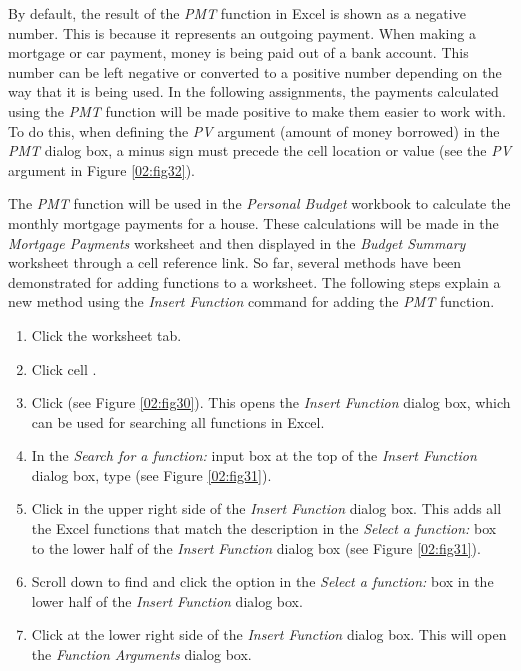 By default, the result of the \textit{PMT} function in Excel is shown as a negative number. This is because it represents an outgoing payment. When making a mortgage or car payment, money is being paid out of a bank account. This number can be left negative or converted to a positive number depending on the way that it is being used. In the following assignments, the payments calculated using the \textit{PMT} function will be made positive to make them easier to work with. To do this, when defining the \textit{PV} argument (amount of money borrowed) in the \textit{PMT} dialog box, a minus sign must precede the cell location or value (see the \textit{PV} argument in Figure \ref{02:fig32}).

The \textit{PMT} function will be used in the \textit{Personal Budget} workbook to calculate the monthly mortgage payments for a house. These calculations will be made in the \textit{Mortgage Payments} worksheet and then displayed in the \textit{Budget Summary} worksheet through a cell reference link. So far, several methods have been demonstrated for adding functions to a worksheet. The following steps explain a new method using the \textit{Insert Function} command for adding the \textit{PMT} function.

\begin{enumbox}
	\begin{enumerate}
		\item Click the  worksheet tab.
		\item Click cell .
		\item Click  (see Figure \ref{02:fig30}). This opens the \textit{Insert Function} dialog box, which can be used for searching all functions in Excel.
		\item In the \textit{Search for a function:} input box at the top of the \textit{Insert Function} dialog box, type  (see Figure \ref{02:fig31}). 
		\item Click  in the upper right side of the \textit{Insert Function} dialog box. This adds all the Excel functions that match the description in the \textit{Select a function:} box to the lower half of the \textit{Insert Function} dialog box (see Figure \ref{02:fig31}).
		\item Scroll down to find and click the  option in the \textit{Select a function:} box in the lower half of the \textit{Insert Function} dialog box.
		\item Click  at the lower right side of the \textit{Insert Function} dialog box. This will open the \textit{Function Arguments} dialog box.
	\end{enumerate}
\end{enumbox}

